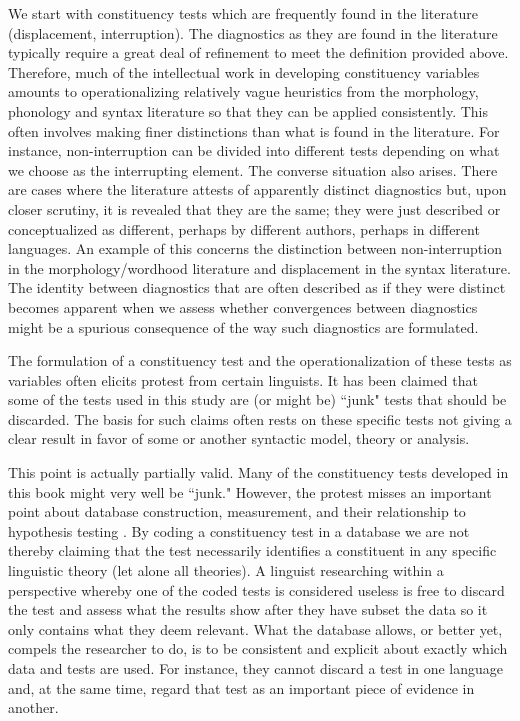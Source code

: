\documentclass[output=paper,draftmode]{langscibook}
\begin{document}
We start with constituency tests which are frequently found in the literature (displacement, interruption). The diagnostics as they are found in the literature typically require a great deal of refinement to meet the definition provided above. Therefore, much of the intellectual work in developing constituency variables amounts to operationalizing relatively vague heuristics from the morphology, phonology and syntax literature so that they can be applied consistently.
This often involves making finer distinctions than what is found in the literature. For instance, non-interruption can be divided into different tests depending on what we choose as the interrupting element. The converse situation also arises. There are cases where the literature attests of apparently distinct diagnostics but, upon closer scrutiny, it is revealed that they are the same; they were just described or conceptualized as different, perhaps by different authors, perhaps in different languages. An example of this concerns the distinction between non-interruption in the morphology/wordhood literature and displacement in the syntax literature. The identity between diagnostics that are often described as if they were distinct becomes apparent when we assess whether convergences between diagnostics might be a spurious consequence of the way such diagnostics are formulated. 

The formulation of a constituency test and the operationalization of these tests as variables often elicits protest from certain linguists. It has been claimed that some of the tests used in this study are (or might be) ``junk" tests that should be discarded. The basis for such claims often rests on these specific tests not giving a clear result in favor of some or another syntactic model, theory or analysis. 

This point is actually partially valid. Many of the constituency tests developed in this book might very well be ``junk." However, the protest misses an important point about database construction, measurement, and their relationship to hypothesis testing \citep[125--149]{ackermann1985data}. By coding a constituency test in a database we are not thereby claiming that the test necessarily identifies a constituent in any specific linguistic theory (let alone all theories). 
A linguist researching within a perspective whereby one of the coded tests is considered useless is free to discard the test and assess what the results show after they have subset the data so it only contains what they deem relevant. What the database allows, or better yet, compels the researcher to do, is to be consistent and explicit about exactly which data and tests are used. For instance, they cannot discard a test in one language and, at the same time, regard that test as an important piece of evidence in another. 
\end{document}
